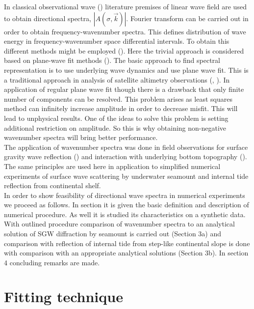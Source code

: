 In classical observational wave () literature premises of linear wave field are used to obtain directional spectra, $|A(\sigma, \vec{k})|$. Fourier transform can be carried out in order to obtain frequency-wavenumber spectra. This defines distribution of wave energy in frequency-wavenumber space differential intervals. To obtain this different methods might be employed (). Here the trivial approach is considered based on plane-wave fit methods (). The basic approach to find spectral representation is to use underlying wave dynamics and use plane wave fit. This is a traditional approach in analysis of satellite altimetry observations (\cite{ray2001estimates}, \cite{zhao2016global}). In application of regular plane wave fit though there is a drawback that only finite number of components can be resolved. This problem arises as least squares method can infinitely increase amplitude in order to decrease misfit. This will lead to unphysical results. One of the ideas to solve this problem is setting additional restriction on amplitude. So this is why obtaining non-negative wavenumber spectra will bring better performance.\\
The application of wavenumber spectra was done in field observations for surface gravity wave reflection (\cite{dickson1995wave}) and interaction with underlying bottom topography (\cite{thomson2005reflection}). The same principles are used here in application to simplified numerical experiments of surface wave scattering by underwater seamount and internal tide reflection from continental shelf.\\
In order to show feasibility of directional wave spectra in numerical experiments we proceed as follows. In section it is given the basic definition and description of numerical procedure. As well it is studied its characteristics on a synthetic data. With outlined procedure comparison of wavenumber spectra to an analytical solution of SGW diffraction by seamount is carried out (Section 3a) and comparison with reflection of internal tide from step-like continental slope is done with comparison with an appropriate analytical solutions (Section 3b). In section 4 concluding remarks are made.

\section{Fitting technique}
